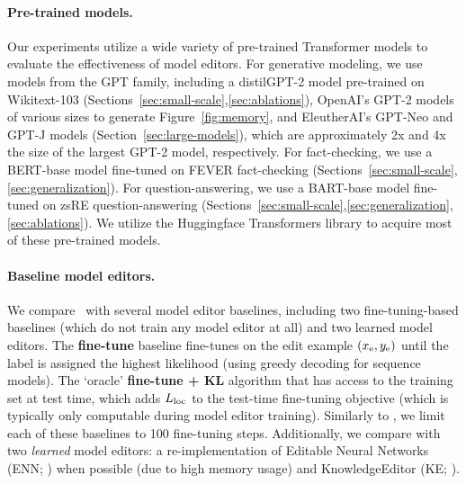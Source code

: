 \documentclass{article}
\begin{document}
\paragraph{Pre-trained models.} Our experiments utilize a wide variety of pre-trained Transformer models to evaluate the effectiveness of model editors. For generative modeling, we use models from the GPT family, including a distilGPT-2 model pre-trained on Wikitext-103 \citep{distilgpt2} (Sections~\ref{sec:small-scale},\ref{sec:ablations}), OpenAI's GPT-2 models of various sizes \citep{radford2019language} to generate Figure~\ref{fig:memory},
and EleutherAI's GPT-Neo and GPT-J models \citep{gpt-neo,gpt-j} (Section~\ref{sec:large-models}), which are approximately 2x and 4x the size of the largest GPT-2 model, respectively. For fact-checking, we use a BERT-base model \citep{devlin2019bert} fine-tuned on FEVER fact-checking \citep{Cao2021EditingFK} (Sections~\ref{sec:small-scale},\ref{sec:generalization}). For question-answering, we use a BART-base model \citep{lewis-etal-2020-bart} fine-tuned on zsRE question-answering \citep{Cao2021EditingFK} (Sections~\ref{sec:small-scale},\ref{sec:generalization},\ref{sec:ablations}). We utilize the Huggingface Transformers library \citep{wolf2019hugging} to acquire most of these pre-trained models.

\paragraph{Baseline model editors.}
We compare \name~with several model editor baselines, including two fine-tuning-based baselines (which do not train any model editor at all) and two learned model editors. The \textbf{fine-tune} baseline fine-tunes on the edit example $(x_\text{e},y_\text{e})$ until the label is assigned the highest likelihood (using greedy decoding for sequence models). The `oracle' \textbf{fine-tune + KL} algorithm that has access to the training set at test time, which adds $L_\text{loc}$
to the test-time fine-tuning objective (which is typically only computable during model editor training). Similarly to \cite{Cao2021EditingFK}, we limit each of these baselines to 100 fine-tuning steps. Additionally, we compare with two \textit{learned} model editors: a re-implementation of Editable Neural Networks (ENN; \citealp{Sinitsin2020Editable}) when possible (due to high memory usage) and  KnowledgeEditor (KE; \citealp{Cao2021EditingFK}).
\end{document}
